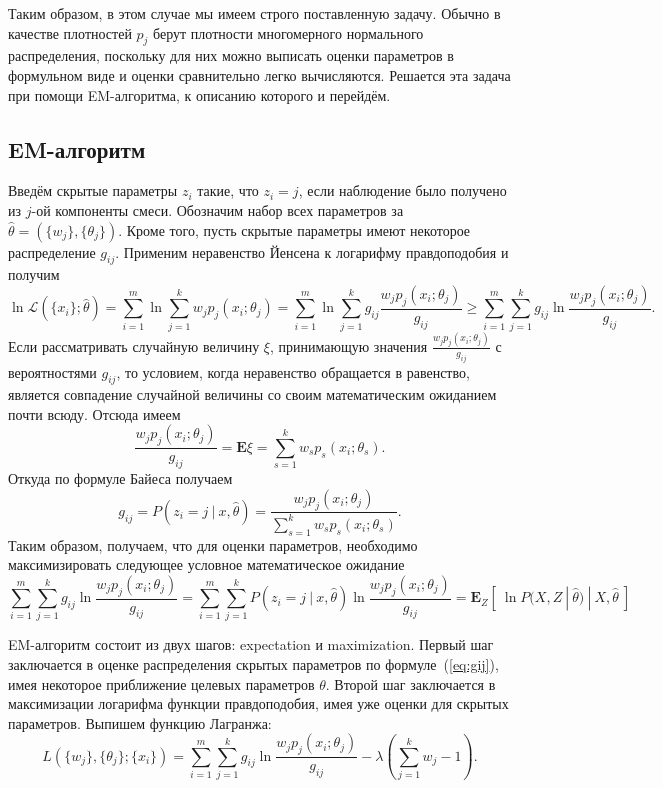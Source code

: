 \documentclass[10pt]{article}
\renewcommand{\geq}{\geqslant}
\newcommand{\E}{\mathbf{E}}
\begin{document}
Таким образом, в этом случае мы имеем строго поставленную задачу. Обычно в качестве плотностей $p_j$ берут плотности многомерного нормального распределения,
поскольку для них можно выписать оценки параметров в формульном виде и оценки сравнительно легко вычисляются.
Решается эта задача при помощи EM-алгоритма, к описанию которого и перейдём.

\subsection{EM-алгоритм}
Введём скрытые параметры $z_i$ такие, что $z_i = j$, если наблюдение было получено из $j$-ой компоненты смеси. 
Обозначим набор всех параметров за $\hat{\theta} = (\{w_j\}, \{\theta_j\})$. Кроме того, пусть скрытые параметры имеют некоторое распределение $g_{ij}$.
Применим неравенство Йенсена к логарифму правдоподобия и получим
$$\ln \mathcal{L}(\{x_i\}; \hat{\theta}) = \sum_{i=1}^m \ln \sum_{j=1}^k w_j p_j(x_i; \theta_j) = \sum_{i=1}^m \ln \sum_{j=1}^k g_{ij} \frac{w_j p_j(x_i; \theta_j)}{g_{ij}} 
\geq \sum_{i=1}^m \sum_{j=1}^k g_{ij} \ln \frac{w_j p_j(x_i; \theta_j)}{g_{ij}}.$$
Если рассматривать случайную величину $\xi$, принимающую значения $\frac{w_j p_j(x_i; \theta_j)}{g_{ij}}$ с вероятностями $g_{ij}$, то условием, 
когда неравенство обращается в равенство, является совпадение случайной величины со своим математическим ожиданием почти всюду. Отсюда имеем
$$\frac{w_j p_j(x_i; \theta_j)}{g_{ij}} = \E \xi = \sum_{s=1}^k w_{s} p_{s}(x_i; \theta_s).$$
Откуда по формуле Байеса получаем
\begin{equation}
	g_{ij} = P(z_i=j~|~x, \hat{\theta}) = \frac{w_j p_j(x_i; \theta_j)}{\sum_{s=1}^k w_{s} p_{s}(x_i; \theta_s) }.
\label{eq:gij}
\end{equation}
Таким образом, получаем, что для оценки параметров, необходимо максимизировать следующее условное математическое ожидание
$$\sum_{i=1}^m \sum_{j=1}^k g_{ij} \ln \frac{w_j p_j(x_i; \theta_j)}{g_{ij}} = \sum_{i=1}^m \sum_{j=1}^k P(z_i=j~|~x, \hat{\theta}) \ln \frac{w_j p_j(x_i; \theta_j)}{g_{ij}} =
\E_{Z } [~\ln P(X, Z ~|~ \hat{\theta})~|~ X, \hat{\theta}~]$$ 

EM-алгоритм состоит из двух шагов: expectation и maximization. Первый шаг заключается в оценке распределения скрытых параметров по формуле~(\ref{eq:gij}),
имея некоторое приближение целевых параметров $\theta$.
Второй шаг заключается в максимизации логарифма функции правдоподобия, имея уже оценки для скрытых параметров.
Выпишем функцию Лагранжа:
$$L(\{w_j\}, \{ \theta_j\} ; \{x_i\}) = \sum_{i=1}^m \sum_{j=1}^k g_{ij} \ln \frac{w_j p_j(x_i; \theta_j)}{g_{ij}} - \lambda \left( \sum_{j=1}^k w_j - 1 \right).$$
\end{document}
